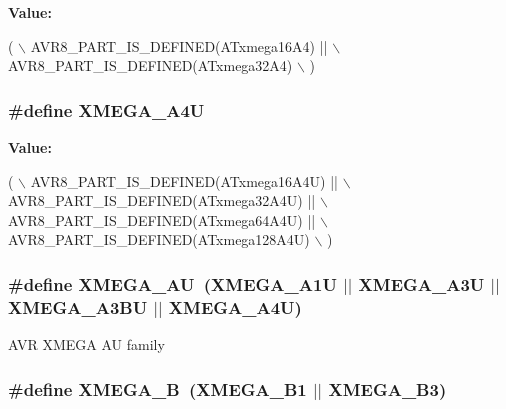 {\bfseries Value\-:}
\begin{DoxyCode}
( \(\backslash\)
        AVR8\_PART\_IS\_DEFINED(ATxmega16A4) || \(\backslash\)
        AVR8\_PART\_IS\_DEFINED(ATxmega32A4) \(\backslash\)
        )
\end{DoxyCode}
\hypertarget{group__xmega__part__macros__group_ga7625edcdd219df905c870d73c1689da6}{
\subsubsection[{X\-M\-E\-G\-A\-\_\-\-A4\-U}]{\setlength{\rightskip}{0pt plus 5cm}\#define X\-M\-E\-G\-A\-\_\-\-A4\-U}}\label{group__xmega__part__macros__group_ga7625edcdd219df905c870d73c1689da6}
{\bfseries Value\-:}
\begin{DoxyCode}
( \(\backslash\)
        AVR8\_PART\_IS\_DEFINED(ATxmega16A4U)  || \(\backslash\)
        AVR8\_PART\_IS\_DEFINED(ATxmega32A4U)  || \(\backslash\)
        AVR8\_PART\_IS\_DEFINED(ATxmega64A4U)  || \(\backslash\)
        AVR8\_PART\_IS\_DEFINED(ATxmega128A4U) \(\backslash\)
        )
\end{DoxyCode}
\hypertarget{group__xmega__part__macros__group_ga55210f3805902072fce76647b50fa177}{
\subsubsection[{X\-M\-E\-G\-A\-\_\-\-A\-U}]{\setlength{\rightskip}{0pt plus 5cm}\#define X\-M\-E\-G\-A\-\_\-\-A\-U~({\bf X\-M\-E\-G\-A\-\_\-\-A1\-U} $|$$|$ {\bf X\-M\-E\-G\-A\-\_\-\-A3\-U} $|$$|$ {\bf X\-M\-E\-G\-A\-\_\-\-A3\-B\-U} $|$$|$ {\bf X\-M\-E\-G\-A\-\_\-\-A4\-U})}}\label{group__xmega__part__macros__group_ga55210f3805902072fce76647b50fa177}
A\-V\-R X\-M\-E\-G\-A A\-U family \hypertarget{group__xmega__part__macros__group_ga62f2c1c93640237425cb64186ddce219}{
\subsubsection[{X\-M\-E\-G\-A\-\_\-\-B}]{\setlength{\rightskip}{0pt plus 5cm}\#define X\-M\-E\-G\-A\-\_\-\-B~({\bf X\-M\-E\-G\-A\-\_\-\-B1} $|$$|$ {\bf X\-M\-E\-G\-A\-\_\-\-B3})}}\label{group__xmega__part__macros__group_ga62f2c1c93640237425cb64186ddce219}
